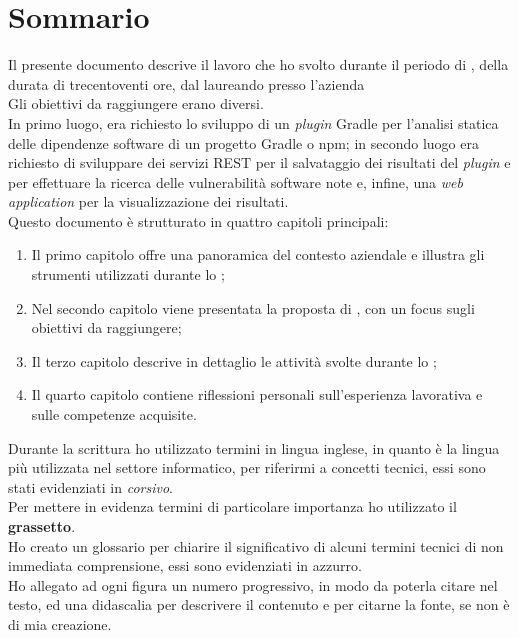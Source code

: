 \cleardoublepage
{}
{}
\begingroup
\let\clearpage\relax
\let\cleardoublepage\relax
\let\cleardoublepage\relax

\chapter*{Sommario}

Il presente documento descrive il lavoro che ho svolto durante il periodo di \stage, della durata di trecentoventi ore, 
dal laureando {\myName} presso l'azienda {\azienda} \\
Gli obiettivi da raggiungere erano diversi.\\
In primo luogo, era richiesto lo sviluppo di un \textit{plugin} Gradle per l'analisi statica delle dipendenze software di un progetto Gradle o npm;
in secondo luogo era richiesto di sviluppare dei servizi REST per il salvataggio dei risultati del \textit{plugin} e per effettuare la ricerca
delle vulnerabilità software note e, infine,
una \textit{web application} per la visualizzazione dei risultati.\\
Questo documento è strutturato in quattro capitoli principali:
\begin{enumerate}
    \item Il primo capitolo offre una panoramica del contesto aziendale e illustra gli strumenti utilizzati durante lo \stage;
    \item Nel secondo capitolo viene presentata la proposta di \stage, con un focus sugli obiettivi da raggiungere;
    \item Il terzo capitolo descrive in dettaglio le attività svolte durante lo \stage;
    \item Il quarto capitolo contiene riflessioni personali sull'esperienza lavorativa e sulle competenze acquisite.
\end{enumerate}

\noindent Durante la scrittura ho utilizzato termini in lingua inglese, in quanto è la lingua più utilizzata nel settore informatico, 
per riferirmi a concetti tecnici, essi sono stati evidenziati in \textit{corsivo}.\\
Per mettere in evidenza termini di particolare importanza ho utilizzato il \textbf{grassetto}.\\
Ho creato un glossario per chiarire il significativo di alcuni termini tecnici di non immediata comprensione, essi sono evidenziati in azzurro.\\
Ho allegato ad ogni figura un numero progressivo, in modo da poterla citare nel testo, ed una didascalia per descrivere il contenuto
e per citarne la fonte, se non è di mia creazione.\\






\endgroup

\vfill

